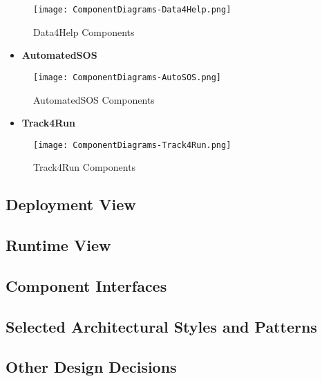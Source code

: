\FloatBarrier
\begin{figure}[!h]
	\centering
	\texttt{[image: ComponentDiagrams-Data4Help.png]}
	\caption{Data4Help Components}
\end{figure}

\FloatBarrier



\begin{itemize}
	\item \textbf{AutomatedSOS}
\end{itemize}

\begin{figure}[!h]
	\centering
	\texttt{[image: ComponentDiagrams-AutoSOS.png]}
	\caption{AutomatedSOS Components}
\end{figure}

\FloatBarrier



\begin{itemize}
	\item \textbf{Track4Run}
\end{itemize}

\FloatBarrier
\begin{figure}[!h]
	\centering
	\texttt{[image: ComponentDiagrams-Track4Run.png]}
	\caption{Track4Run Components}
\end{figure}

\FloatBarrier


\subsection{Deployment View}
\subsection{Runtime View}
\subsection{Component Interfaces}
\subsection{Selected Architectural Styles and Patterns}
\subsection{Other Design Decisions}